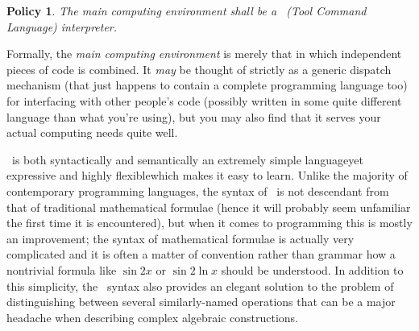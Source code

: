 \documentclass{mtmtcl}
\theoremstyle{plain}
\newtheorem{policy}{Policy}
\theoremstyle{remark}
\begin{document}
\begin{policy} \label{Policy:Tcl}
  The main computing environment shall be a \Tcl~(Tool Command 
  Language) interpreter.
\end{policy}

Formally, the \emph{main computing environment} is merely that in 
which independent pieces of code is combined. It \emph{may} be 
thought of strictly as a generic dispatch mechanism (that just happens 
to contain a complete programming language too) for interfacing with 
other people's code (possibly written in some quite different language 
than what you're using), but you may also find that it serves your 
actual computing needs quite well.

\Tcl\ is both syntactically and semantically an extremely simple 
language\Ldash yet expressive and highly flexible\Rdash which makes 
it easy to learn. Unlike the majority of contemporary programming 
languages, the syntax of \Tcl\ is not descendant from that of 
traditional mathematical formulae (hence it will probably seem 
unfamiliar the first time it is encountered), but when it comes to 
programming this is mostly an improvement; the syntax of mathematical 
formulae is actually very complicated and it is often a matter of 
convention rather than grammar how a nontrivial formula like $\sin 
2x$ or $\sin 2\ln x$ should be understood. In addition to this 
simplicity, the \Tcl\ syntax also provides an elegant solution to 
the problem of distinguishing between several similarly-named 
operations that can be a major headache when describing complex 
algebraic constructions.
\end{document}
